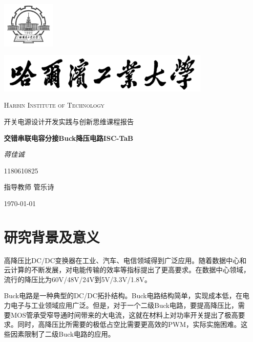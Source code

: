 \graphicspath{{chapter/}{figures/}}
\begin{titlepage}
	\centering
	\includegraphics[width=0.2\textwidth]{sf1.png}\par
	\vspace{1cm}
	\includegraphics[width=0.8\textwidth]{sf.jpg}\par
	\vspace{0.1cm}
	{\scshape\LARGE Harbin Institute of Technology \par}
	\vspace{1cm}
	{\kaishu\LARGE 开关电源设计开发实践与创新思维课程报告\par}
	\vspace{1.5cm}
	{\huge\bfseries 交错串联电容分接Buck降压电路ISC-TaB\par}
	\vspace{2cm}
	{\fangsong\Large\itshape 蒋佳诚\par}
	\vfill
	{1180610825}\par
	\vfill
	指导教师	\textsc{管乐诗}
	\vfill
	{\large \today\par}
\end{titlepage}

\chapter{研究背景及意义}
高降压比DC/DC变换器在工业、汽车、电信领域得到广泛应用。随着数据中心和云计算的不断发展，对电能传输的效率等指标提出了更高要求。在数据中心领域，流行的降压比为60V/48V/24V到5V/3.3V/1.8V。


Buck电路是一种典型的DC/DC拓扑结构。Buck电路结构简单，实现成本低，在电力电子与工业领域应用广泛。但是，对于一个二级Buck电路，要提高降压比，需要MOS管承受窄导通时间带来的大电流，这就在材料上对功率开关提出了极高要求。同时，高降压比所需要的极低占空比需要更高效的PWM，实际实施困难。这些因素限制了二级Buck电路的应用。



